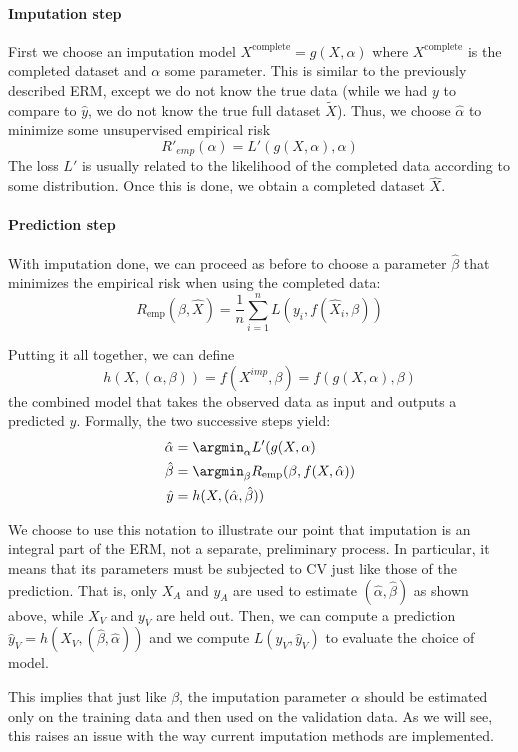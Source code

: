 			\paragraph{Imputation step}
First we choose an imputation model $X^{\text{complete}} = g(X, \alpha)$ where $X^{\text{complete}}$ is the completed dataset and $\alpha$ some parameter. This is similar to the previously described ERM, except we do not know the true data (while we had $y$ to compare to $\hat{y}$, we do not know the true full dataset $\tilde{X}$). Thus, we choose $\hat{\alpha}$ to minimize some unsupervised empirical risk
$$R'_{emp}(\alpha)=L'(g(X, \alpha), \alpha)$$
The loss $L'$ is usually related to the likelihood of the completed data according to some distribution\cite{ref_amelia}. Once this is done, we obtain a completed dataset $\hat{X}$.

			\paragraph{Prediction step}
With imputation done, we can proceed as before to choose a parameter $\hat{\beta}$ that minimizes the empirical risk when using the completed data:
	$$ R_{\text{emp}}(\beta, \hat{X}) = \frac{1}{n} \sum\limits_{i=1}^n L(y_i, f(\hat{X}_i, \beta))$$
	
Putting it all together, we can define 
$$ h(X, (\alpha, \beta)) = f(X^{imp}, \beta) = f( g(X, \alpha), \beta) $$
the combined model that takes the observed data as input and outputs a predicted $y$. Formally, the two successive steps yield:
\begin{align*}
\hat{\alpha} &= \argmin_{\alpha} L'(g(X,\alpha) \\
\hat{\beta} &= \argmin_{\beta} R_{\text{emp}}(\beta,f(X,\hat{\alpha})) \\
\hat{y} &= h(X, (\hat{\alpha}, \hat{\beta}))
\end{align*}

We choose to use this notation to illustrate our point that imputation is an integral part of the ERM, not a separate, preliminary process. In particular, it means that its parameters must be subjected to CV just like those of the prediction. That is, only $X_A$ and $y_A$ are used to estimate $(\hat{\alpha}, \hat{\beta})$ as shown above, while $X_V$ and $y_V$ are held out. Then, we can compute a prediction $\hat{y}_V = h(X_V, (\hat{\beta}, \hat{\alpha}))$ and we compute $L(y_V, \hat{y}_V)$ to evaluate the choice of model.

This implies that just like $\beta$, the imputation parameter $\alpha$ should be estimated only on the training data and then used on the validation data. As we will see, this raises an issue with the way current imputation methods are implemented.

